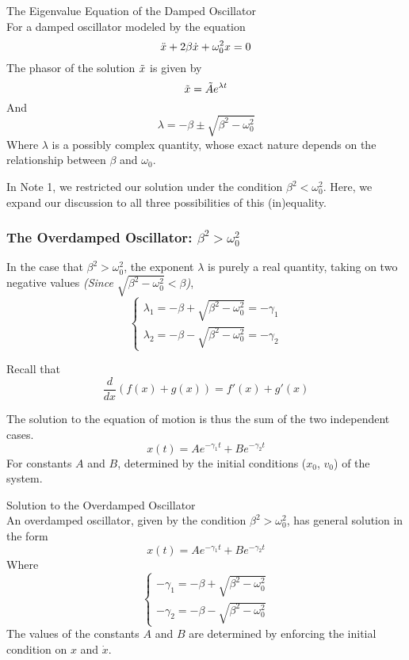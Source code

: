 \documentclass[11pt]{article}
\theoremstyle{gangnamstyle}{\newtheorem{definition}{Definition}[]}
\theoremstyle{gangnamstyle}{\newtheorem{example}{Example}[]}
\theoremstyle{gangnamstyle}{\newtheorem{problem}{Problem}[]}
\theoremstyle{gangnamstyle}{\newtheorem{warning}{Warning}[]}
\begin{document}
\begin{definition}
The Eigenvalue Equation of the Damped Oscillator \\
For a damped oscillator modeled by the equation
\begin{equation}
\Ddot{x} + 2\beta\Dot{x} + \omega_0^2x = 0
\end{equation}
The phasor of the solution $\Tilde{x}$ is given by
\begin{equation}
\Tilde{x} = \Tilde{A}e^{\lambda t}
\end{equation}
And
\begin{equation}
\lambda = -\beta \pm \sqrt{\beta^2 - \omega_0^2}
\end{equation}
Where $\lambda$ is a possibly complex quantity, whose exact nature depends on the relationship between $\beta$ and $\omega_0$. 
\end{definition}

In Note 1, we restricted our solution under the condition $\beta^2 < \omega_0^2$. Here, we expand our discussion to all three possibilities of this (in)equality. 

\subsubsection{The Overdamped Oscillator: $\beta^2 > \omega_0^2$}

In the case that $\beta^2 > \omega_0^2$, the exponent $\lambda$ is purely a real quantity, taking on two negative values \textit{(Since $\sqrt{\beta^2 - \omega_0^2} < \beta$)}, 
\[ \begin{cases}
\lambda_1 = -\beta + \sqrt{\beta^2 - \omega_0^2} = - \gamma_1 \\
\lambda_2 = -\beta - \sqrt{\beta^2 - \omega_0^2} = - \gamma_2
\end{cases} \]

Recall that
\[ \frac{d}{dx}(f(x) + g(x)) = f'(x) + g'(x) \]

The solution to the equation of motion is thus the sum of the two independent cases. 
\[ x(t) = Ae^{-\gamma_1t} + Be^{-\gamma_2t} \]
For constants $A$ and $B$, determined by the initial conditions ($x_0$, $v_0$) of the system. 

\begin{definition}
Solution to the Overdamped Oscillator \\
An overdamped oscillator, given by the condition $\beta^2 > \omega_0^2$, has general solution in the form
\begin{equation}
x(t) = Ae^{-\gamma_1t} + Be^{-\gamma_2t}
\end{equation}
Where
\[ \begin{cases}
- \gamma_1 = -\beta + \sqrt{\beta^2 - \omega_0^2} \\
- \gamma_2 = -\beta - \sqrt{\beta^2 - \omega_0^2}
\end{cases} \]
The values of the constants $A$ and $B$ are determined by enforcing the initial condition on $x$ and $\Dot{x}$.
\end{definition}
\end{document}
